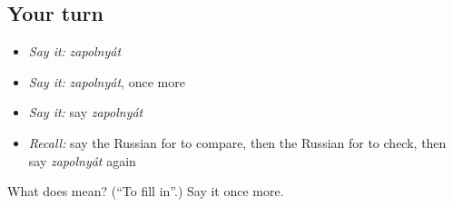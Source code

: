 \subsection*{Your turn}
\begin{itemize}
\raggedright
  \item \emph{Say it:} \emph{zapolnyát}
  \item \emph{Say it:} \emph{zapolnyát}, once more
  \item \emph{Say it:} say \emph{zapolnyát}
  \item \emph{Recall:} say the Russian for to compare, then the Russian for to check, then say \emph{zapolnyát} again
\end{itemize}

\begin{tcolorbox}[breakable,colback=teal!4,colframe=teal!35!black,title={Before you move on}]
What does  mean? (\textquotedblleft{}To fill in\textquotedblright{}.) Say it once more.
\end{tcolorbox}
